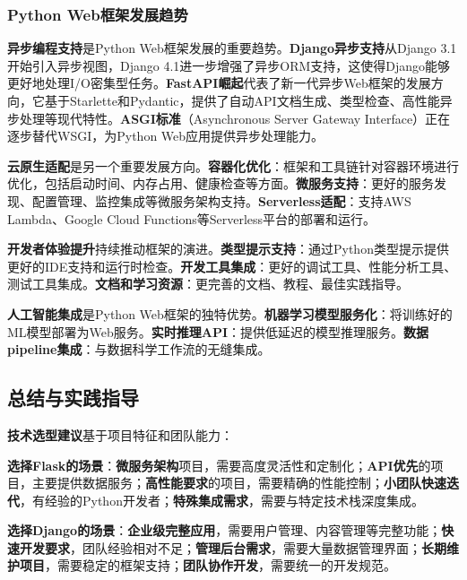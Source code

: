 \subsubsection{Python Web框架发展趋势}\label{python-webux6846ux67b6ux53d1ux5c55ux8d8bux52bf}

\textbf{异步编程支持}是Python Web框架发展的重要趋势。\textbf{Django异步支持}从Django 3.1开始引入异步视图，Django 4.1进一步增强了异步ORM支持，这使得Django能够更好地处理I/O密集型任务。\textbf{FastAPI崛起}代表了新一代异步Web框架的发展方向，它基于Starlette和Pydantic，提供了自动API文档生成、类型检查、高性能异步处理等现代特性。\textbf{ASGI标准}（Asynchronous Server Gateway Interface）正在逐步替代WSGI，为Python Web应用提供异步处理能力。

\textbf{云原生适配}是另一个重要发展方向。\textbf{容器化优化}：框架和工具链针对容器环境进行优化，包括启动时间、内存占用、健康检查等方面。\textbf{微服务支持}：更好的服务发现、配置管理、监控集成等微服务架构支持。\textbf{Serverless适配}：支持AWS Lambda、Google Cloud Functions等Serverless平台的部署和运行。

\textbf{开发者体验提升}持续推动框架的演进。\textbf{类型提示支持}：通过Python类型提示提供更好的IDE支持和运行时检查。\textbf{开发工具集成}：更好的调试工具、性能分析工具、测试工具集成。\textbf{文档和学习资源}：更完善的文档、教程、最佳实践指导。

\textbf{人工智能集成}是Python Web框架的独特优势。\textbf{机器学习模型服务化}：将训练好的ML模型部署为Web服务。\textbf{实时推理API}：提供低延迟的模型推理服务。\textbf{数据pipeline集成}：与数据科学工作流的无缝集成。

\subsection{总结与实践指导}\label{ux603bux7ed3ux4e0eux5b9eux8df5ux6307ux5bfc}

\textbf{技术选型建议}基于项目特征和团队能力：

\textbf{选择Flask的场景}：\textbf{微服务架构}项目，需要高度灵活性和定制化；\textbf{API优先}的项目，主要提供数据服务；\textbf{高性能要求}的项目，需要精确的性能控制；\textbf{小团队快速迭代}，有经验的Python开发者；\textbf{特殊集成需求}，需要与特定技术栈深度集成。

\textbf{选择Django的场景}：\textbf{企业级完整应用}，需要用户管理、内容管理等完整功能；\textbf{快速开发要求}，团队经验相对不足；\textbf{管理后台需求}，需要大量数据管理界面；\textbf{长期维护项目}，需要稳定的框架支持；\textbf{团队协作开发}，需要统一的开发规范。

